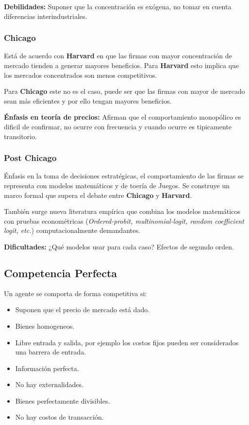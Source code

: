\documentclass[letterpaper,12pt,twocolumn]{report}
\begin{document}
\textbf{Debilidades:} Suponer que la concentración es exógena, no tomar en cuenta diferencias interindustriales.

\subsubsection*{Chicago}

Está de acuerdo con \textbf{Harvard} en que las firmas con mayor concentración de mercado tienden a generar mayores beneficios. Para \textbf{Harvard} esto implica que los mercados concentrados son menos competitivos.

Para \textbf{Chicago} este no es el caso, puede ser que las firmas con mayor de mercado sean más eficientes y por ello tengan mayores beneficios.

\textbf{Énfasis en teoría de precios:} Afirman que el comportamiento monopólico es dificil de confirmar, no ocurre con frecuencia y cuando ocurre es tipicamente transitorio.

\subsubsection*{Post Chicago}

Énfasis en la toma de decisiones estratégicas, el comportamiento de las firmas se representa con modelos matemáticos y de toería de Juegos. Se construye un marco formal que supera el debate entre \textbf{Chicago} y \textbf{Harvard}.

También surge nueva literatura empírica que combina los modelos matemáticos con pruebas econométricas (\textit{Ordered-probit, multinomial-logit, random coefficient logit, etc.}) computacionalmente demandantes.

\textbf{Dificultades:} ¿Qué modelos usar para cada caso? Efectos de segundo orden.

\subsection*{Competencia Perfecta}

\begin{tcolorbox}[title= Supuestos]

Un agente se comporta de forma competitiva si:

\begin{itemize}
    \item Suponen que el precio de mercado está dado.
    \item Bienes homogeneos.
    \item Libre entrada y salida, por ejemplo los costos fijos pueden ser considerados una barrera de entrada.
    \item Información perfecta.
    \item No hay externalidades.
    \item Bienes perfectamente divisibles.
    \item No hay costos de transacción.
\end{itemize}

\end{tcolorbox}
\end{document}
